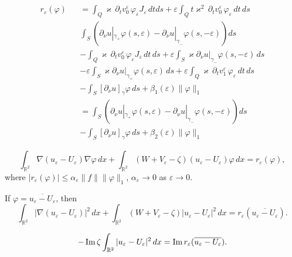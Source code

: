 \documentclass[graybox]{svmult}
\renewcommand{\Im}{\mathop{\rm Im}}
\renewcommand{\kappa}{\varkappa}
\newcommand{\Real}{\mathbb R}
\newcommand{\eps}{\varepsilon}
\renewcommand{\phi}{\varphi}
\renewcommand{\leq}{\leqslant}
\begin{document}
\begin{eqnarray}\nonumber
r_\eps(\phi)&&= \int_Q \kappa\,\partial_t v_0^\eps\, \phi_\eps J_\eps\,dt ds+\eps\int_Q t\kappa^2\,\partial_t v_0^\eps \,\phi_\eps \,dt \,ds
\\\nonumber
      &&
\int_S\left(\partial_\nu u|_{\gamma_+}\phi(s,\eps)-\partial_\nu u|_{\gamma_-}\phi(s,-\eps)\right)ds\\\nonumber
&&-
\int_Q\kappa \,\partial_t v_0^\eps\, \phi_\eps J_\eps\,dt\, ds+\eps \int_S \kappa\partial_\nu u|_{\gamma_-}\phi(s,-\eps)\,ds
\\\nonumber
&&-
\eps \int_S \kappa\partial_\nu u|_{\gamma_+}\phi(s,\eps)\,ds
+\eps\int_Q\kappa \,\partial_t v_1^\eps\, \phi_\eps\,dt\, ds
\\\nonumber
      &&
-\int_S [\partial_\nu u]_{\gamma} \phi\,ds+\beta_1(\eps)\|\phi\|_1
\\\nonumber
&&
=\int_S\left(\partial_\nu u|_{\gamma_+}\phi(s,\eps)-\partial_\nu u|_{\gamma_-}\phi(s,-\eps)\right)ds
\\\nonumber
&&
-\int_S [\partial_\nu u]_{\gamma} \phi\,ds+\beta_2(\eps)\|\phi\|_1
\end{eqnarray}


$$
\int_{\Real^2}\nabla (u_\eps-U_\eps) \nabla \phi\,dx+
             \int_{\Real^2} (W+V_\eps-\zeta)(u_\eps-U_\eps) \phi\,dx=r_\eps(\phi),
$$
where $|r_\eps(\phi)|\leq \alpha_\eps\|f\| \|\phi\|_1$, $\alpha_\eps\to 0$ as $\eps\to 0$.

If $\phi=\overline{u_\eps-U_\eps}$, then
$$
\int_{\Real^2}|\nabla (u_\eps-U_\eps)|^2\,dx+
             \int_{\Real^2} (W+V_\eps-\zeta)|u_\eps-U_\eps|^2\,dx=r_\eps(\overline{u_\eps-U_\eps}).
$$

$$
-\Im \zeta \int_{\Real^2}|u_\eps-U_\eps|^2\,dx=\Im r_\eps(\overline{u_\eps-U_\eps}).
$$

















\newpage

\end{document}
